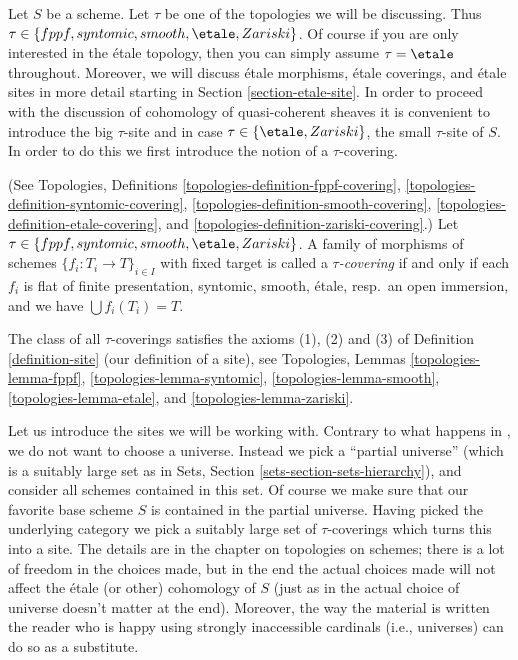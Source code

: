 \noindent
Let $S$ be a scheme.
Let $\tau$ be one of the topologies we will be discussing.
Thus $\tau \in \{fppf, syntomic, smooth, \etale, Zariski\}$.
Of course if you are only interested in the \'etale topology, then
you can simply assume $\tau = \etale$ throughout. Moreover, we will
discuss \'etale morphisms, \'etale coverings, and \'etale sites
in more detail starting in Section \ref{section-etale-site}.
In order to proceed with the discussion of cohomology of
quasi-coherent sheaves it is convenient to introduce the
big $\tau$-site and in case $\tau \in \{\etale, Zariski\}$, the
small $\tau$-site of $S$. In order to do this we first introduce
the notion of a $\tau$-covering.

\begin{definition}
\label{definition-tau-covering}
(See
Topologies, Definitions
\ref{topologies-definition-fppf-covering},
\ref{topologies-definition-syntomic-covering},
\ref{topologies-definition-smooth-covering},
\ref{topologies-definition-etale-covering}, and
\ref{topologies-definition-zariski-covering}.)
Let $\tau \in \{fppf, syntomic, smooth, \etale, Zariski\}$.
A family of morphisms of schemes $\{f_i : T_i \to T\}_{i \in I}$ with fixed
target is called a {\it $\tau$-covering} if and only if
each $f_i$ is flat of finite presentation, syntomic, smooth, \'etale,
resp.\ an open immersion, and we have $\bigcup f_i(T_i) = T$.
\end{definition}

\noindent
The class of all $\tau$-coverings satisfies the axioms
(1), (2) and (3) of
Definition \ref{definition-site} (our definition of a site), see
Topologies, Lemmas
\ref{topologies-lemma-fppf},
\ref{topologies-lemma-syntomic},
\ref{topologies-lemma-smooth},
\ref{topologies-lemma-etale}, and
\ref{topologies-lemma-zariski}.

\medskip\noindent
Let us introduce the sites we will be working with.
Contrary to what happens in
\cite{SGA4}, we do not want to choose a universe. Instead we pick a ``partial
universe'' (which is a suitably large set as in
Sets, Section \ref{sets-section-sets-hierarchy}), and consider all schemes
contained in this set. Of course we make sure that our favorite base scheme
$S$ is contained in the partial universe. Having picked the underlying category
we pick a suitably large set of $\tau$-coverings which turns this into a site.
The details are in the chapter on topologies on schemes; there is a lot of
freedom in the choices made, but in the end the actual choices made will not
affect the \'etale (or other) cohomology of $S$ (just as in \cite{SGA4} the
actual choice of universe doesn't matter at the end). Moreover, the way the
material is written the reader who is happy using strongly inaccessible
cardinals (i.e., universes) can do so as a substitute.

